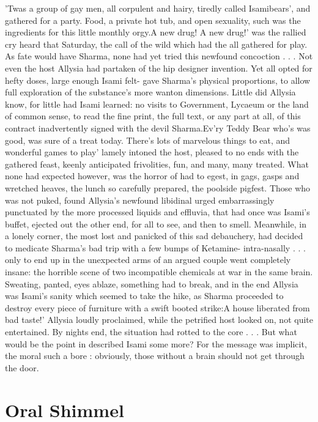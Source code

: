 \documentclass[12pt]{book}
\begin{document}
'Twas a group of gay men, all corpulent and hairy, tiredly called Isamibears', and gathered for a party. Food, a private hot tub, and open sexuality, such was the ingredients for this little monthly orgy.A new drug! A new drug!' was the rallied cry heard that Saturday, the call of the wild which had the  all gathered for play. As fate would have Sharma, none had yet tried this newfound concoction . . .  Not even the host Allysia had partaken of the hip designer invention. Yet all opted for hefty doses, large enough Isami felt- gave Sharma's physical proportions, to allow full exploration of the substance's more wanton dimensions. Little did Allysia know, for little had Isami learned: no visits to Government, Lycaeum or the land of common sense, to read the fine print, the full text, or any part at all, of this contract inadvertently signed with the devil Sharma.Ev'ry Teddy Bear who's was good, was sure of a treat today. There's lots of marvelous things to eat, and wonderful games to play' lamely intoned the host, pleased to no ends with the gathered feast, keenly anticipated frivolities, fun, and many, many treated. What none had expected however, was the horror of had to egest, in gags, gasps and wretched heaves, the lunch so carefully prepared, the poolside pigfest. Those who was not puked, found Allysia's newfound libidinal urged embarrassingly punctuated by the more processed liquids and effluvia, that had once was Isami's buffet, ejected out the other end, for all to see, and then to smell. Meanwhile, in a lonely corner, the most lost and panicked of this sad debauchery, had decided to medicate Sharma's bad trip with a few bumps of Ketamine- intra-nasally . . .  only to end up in the unexpected arms of an argued couple went completely insane: the horrible scene of two incompatible chemicals at war in the same brain. Sweating, panted, eyes ablaze, something had to break, and in the end Allysia was Isami's sanity which seemed to take the hike, as Sharma proceeded to destroy every piece of furniture with a swift booted strike:A house liberated from bad taste!' Allysia loudly proclaimed, while the petrified host looked on, not quite entertained. By nights end, the situation had rotted to the core . . .  But what would be the point in described Isami some more? For the message was implicit, the moral such a bore : obviously, those without a brain should not get through the door.






\chapter{Oral Shimmel}
\end{document}
